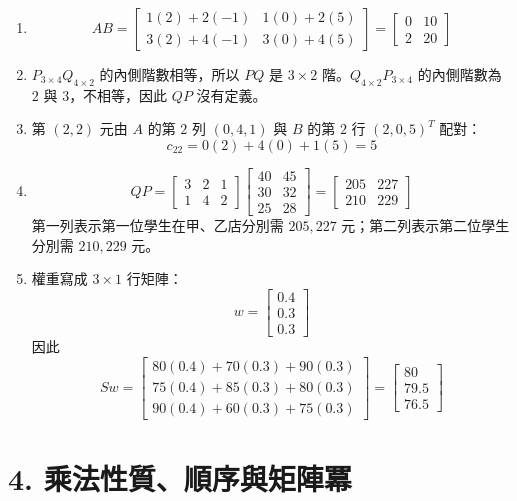 \documentclass[11pt,a4paper]{article}
\begin{document}
\begin{enumerate}
\def\labelenumi{\arabic{enumi}.}
\item
  \[
   AB=\begin{bmatrix}
   1(2)+2(-1)&1(0)+2(5)\\
   3(2)+4(-1)&3(0)+4(5)
   \end{bmatrix}
   =\begin{bmatrix}0&10\\2&20\end{bmatrix}
   \]
\item
  \(P_{3\times4}Q_{4\times2}\) 的內側階數相等，所以 \(PQ\) 是 \(3\times2\) 階。\(Q_{4\times2}P_{3\times4}\) 的內側階數為 \(2\) 與 \(3\)，不相等，因此 \(QP\) 沒有定義。
\item
  第 \((2,2)\) 元由 \(A\) 的第 \(2\) 列 \((0,4,1)\) 與 \(B\) 的第 \(2\) 行 \((2,0,5)^T\) 配對：
  \[c_{22}=0(2)+4(0)+1(5)=5\]
\item
  \[
   QP=
   \begin{bmatrix}3&2&1\\1&4&2\end{bmatrix}
   \begin{bmatrix}40&45\\30&32\\25&28\end{bmatrix}
   =\begin{bmatrix}205&227\\210&229\end{bmatrix}
   \]
  第一列表示第一位學生在甲、乙店分別需 \(205,227\) 元；第二列表示第二位學生分別需 \(210,229\) 元。
\item
  權重寫成 \(3\times1\) 行矩陣：
  \[
  w=\begin{bmatrix}0.4\\0.3\\0.3\end{bmatrix}
  \]
  因此
  \[
  Sw=
  \begin{bmatrix}
  80(0.4)+70(0.3)+90(0.3)\\
  75(0.4)+85(0.3)+80(0.3)\\
  90(0.4)+60(0.3)+75(0.3)
  \end{bmatrix}
  =\begin{bmatrix}80\\79.5\\76.5\end{bmatrix}
  \]
\end{enumerate}

\section{4. 乘法性質、順序與矩陣冪}\label{ux4e58ux6cd5ux6027ux8ceaux9806ux5e8fux8207ux77e9ux9663ux51aa}
\end{document}
